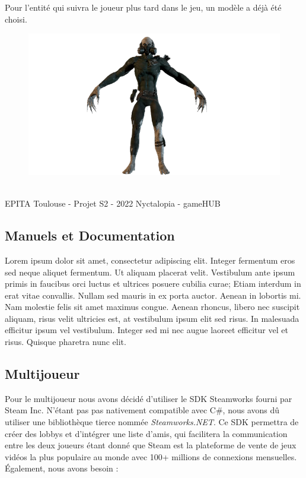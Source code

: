 Pour l'entité qui suivra le joueur plus tard dans le jeu, un modèle a déjà été choisi.
\newline

\begin{figure}[H]
\centering
\begin{minipage}{.5\textwidth}
  \centering
  \centerline{\includegraphics[width=1\linewidth]{img/assets/sterven.png}}
  \label{fig:fusebox}
\end{minipage}%
\end{figure}

\vfill
\noindent\makebox[\linewidth]{\rule{.8\paperwidth}{.6pt}}\\[0.2cm]
EPITA Toulouse - Projet S2 - 2022 \hfill Nyctalopia - gameHUB
\noindent\makebox[\linewidth]{\rule{.8\paperwidth}{.6pt}}

\newpage

\subsection{Manuels et Documentation}
\setlength{\parindent}{5ex}
Lorem ipsum dolor sit amet, consectetur adipiscing elit. Integer fermentum eros sed neque aliquet fermentum. Ut aliquam placerat velit. Vestibulum ante ipsum primis in faucibus orci luctus et ultrices posuere cubilia curae; Etiam interdum in erat vitae convallis. Nullam sed mauris in ex porta auctor. Aenean in lobortis mi. Nam molestie felis sit amet maximus congue. Aenean rhoncus, libero nec suscipit aliquam, risus velit ultricies est, at vestibulum ipsum elit sed risus. In malesuada efficitur ipsum vel vestibulum. Integer sed mi nec augue laoreet efficitur vel et risus. Quisque pharetra nunc elit.

\subsection{Multijoueur}
\setlength{\parindent}{5ex}
Pour le multijoueur nous avons décidé d'utiliser le SDK Steamworks fourni par Steam Inc. N'étant pas pas nativement compatible avec C\#, nous avons dû utiliser une bibliothèque tierce nommée {\emph{Steamworks.NET}}. Ce SDK permettra de créer des lobbys et d'intégrer une liste d'amis, qui facilitera la communication entre les deux joueurs étant donné que Steam est la plateforme de vente de jeux vidéos la plus populaire au monde avec 100+ millions de connexions mensuelles. Également, nous avons besoin :

